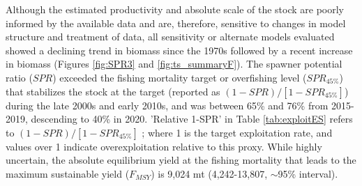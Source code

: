 \documentclass[11pt,
  english,
  a4paper,
]{article}
\begin{document}
\leavevmode\tagmcend\tagstructend

Although the estimated productivity and absolute scale of the stock are poorly informed by the available data and are, therefore, sensitive to changes in model structure and treatment of data, all sensitivity or alternate models evaluated showed a declining trend in biomass since the 1970s followed by a recent increase in biomass (Figures \ref{fig:SPR3} and \ref{fig:ts_summaryF}). The spawner potential ratio ($SPR$)  exceeded the fishing mortality target or overfishing level ($SPR_{45\%}$) that stabilizes the stock at the target (reported as $(1-SPR)/[1-SPR_{45\%}]$) during the late 2000s and early 2010s, and was between  65\% and 76\% from 2015-2019, descending to 40\% in 2020.
'Relative 1-SPR' in Table \ref{tab:exploitES} refers to $(1-SPR)/[1-SPR_{45\%}]$ ; where 1 is the target exploitation rate, and values over 1 indicate overexploitation relative to this proxy. While highly uncertain, the
absolute equilibrium yield at the fishing mortality that leads to the maximum sustainable yield ($F_{MSY}$) is 9,024 mt (4,242-13,807, $\sim$95\% interval).

\begingroup\fontsize{9}{10}\selectfont
\begingroup\fontsize{9}{10}\selectfont
\end{document}
